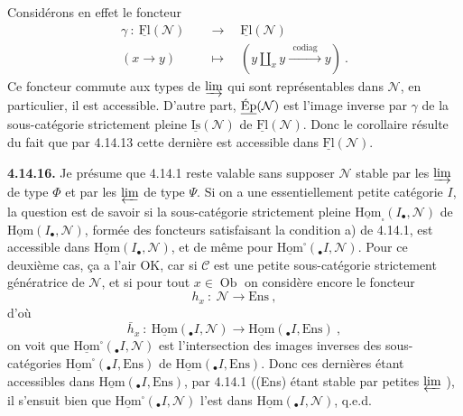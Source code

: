 \documentclass[11pt]{article}
\newcommand{\printedpage}[1]{\marginpar{\footnotesize p.~#1}}
\newcommand{\msp}[1]{\marginpar{\footnotesize [#1]}}
\newcommand{\Ob}{\operatorname{Ob}}
\newcommand{\uHom}{\underline{\mathrm{Hom}}}
\newcommand{\uFl}{\underline{\mathrm{Fl}}}
\newcommand{\uIs}{\underline{\mathrm{Is}}}
\newcommand{\uEp}{\underline{\textup{Ép}}}
\newcommand{\Ens}{\mathrm{Ens}}
\begin{document}
\printedpage{147}

\msp{page 388}
Considérons en effet le foncteur
\[
\begin{aligned}
\gamma \ : \ \uFl(\mathcal{N}) \quad &\longrightarrow \quad \uFl(\mathcal{N}) \\
(x \longrightarrow y) \quad &\longmapsto \quad (y \amalg_x y \xrightarrow{\ \ \text{codiag}\ \ } y) \ .
\end{aligned}
\]
Ce foncteur commute aux types de $\varinjlim$ qui sont représentables dans $\mathcal{N}$, en particulier, il est accessible. D'autre part, $\uEp(\mathcal{N})$ est l'image inverse par $\gamma$ de la sous-catégorie strictement pleine $\uIs(\mathcal{N})$ de $\uFl(\mathcal{N})$. Donc le corollaire résulte du fait que par 4.14.13 cette dernière est accessible dans $\uFl(\mathcal{N})$.

\textbf{4.14.16.} Je présume que 4.14.1 reste valable sans supposer $\mathcal{N}$ stable par les $\varinjlim$ de type $\Phi$ et par les $\varprojlim$ de type $\Psi$. Si on a une essentiellement petite catégorie $I$, la question est de savoir si la sous-catégorie strictement pleine $\uHom_{\square}(I_\bullet,\mathcal{N})$ de $\uHom(I_\bullet,\mathcal{N})$, formée des foncteurs satisfaisant
\msp{page 389}
la condition a) de 4.14.1, est accessible dans $\uHom(I_\bullet,\mathcal{N})$, et de même pour $\uHom^{\square}({}_\bullet I,\mathcal{N})$. Pour ce deuxième cas, ça a l'air OK, car si $\mathcal{C}$ est une petite sous-catégorie strictement génératrice de $\mathcal{N}$, et si pour tout $x \in \Ob$ on considère encore le foncteur
\[
h_x \ : \ \mathcal{N} \longrightarrow \Ens \ ,
\]
d'où
\[
\bar{h}_x \ : \ \uHom({}_\bullet I,\mathcal{N}) \longrightarrow \uHom({}_\bullet I,\Ens) \ ,
\]
on voit que $\uHom^{\square}({}_\bullet I,\mathcal{N})$ est l'intersection des images inverses des sous-catégories $\uHom^{\square}({}_\bullet I,\Ens)$ de $\uHom({}_\bullet I,\Ens)$. Donc ces dernières étant accessibles dans $\uHom({}_\bullet I,\Ens)$, par 4.14.1 ((Ens) étant stable par petites $\varprojlim$ ), il s'ensuit bien que $\uHom^{\square}({}_\bullet I,\mathcal{N})$ l'est dans $\uHom({}_\bullet I,\mathcal{N})$, q.e.d.
\end{document}
